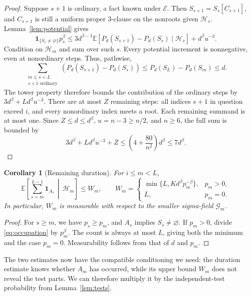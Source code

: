 \documentclass[11pt]{article}
\newtheorem{corollary}[theorem]{Corollary}
\theoremstyle{remark}
\newcommand{\E}{\mathbb E}
\newcommand{\ind}{\mathbf 1}
\newcommand{\cE}{\mathcal E}
\newcommand{\cG}{\mathcal G}
\newcommand{\cH}{\mathcal H}
\numberwithin{equation}{section}
\begin{document}
\begin{proof}
Suppose $s+1$ is ordinary, a fact known under $\cE$.
Then $S_{s+1}=S_s[C_{s+1}]$, and $C_{s+1}$ is still a uniform proper
3-clause on the nonroots given $\cH_s$. Lemma~\ref{lem:potential} gives
\[
 \ind_{\{S_s\ne\varnothing\}}p_s^\beta
 \le3d^{\beta-1}\E[P_d(S_{s+1})-P_d(S_s)\mid\cH_s]
          +d^\beta u^{-3}.
\]
Condition on $\cH_m$ and sum over such $s$. Every potential increment
is nonnegative, even at nonordinary steps. Thus, pathwise,
\[
 \sum_{\substack{m\le s<L\\s+1\text{ ordinary}}}
       (P_d(S_{s+1})-P_d(S_s))
 \le P_d(S_L)-P_d(S_m)\le d.
\]
The tower property therefore bounds the contribution of the ordinary
steps by $3d^\beta+Ld^\beta u^{-3}$.
There are at most $Z$ remaining steps: all indices $s+1$ in question
exceed $i$, and every nonordinary index meets a root.
Each remaining summand is at most one. Since $Z\le d\le d^\beta$,
$u=n-3\ge n/2$, and $n\ge6$, the full sum is bounded by
\[
 3d^\beta+Ld^\beta u^{-3}+Z
 \le \left(4+\frac{80}{n^2}\right)d^\beta\le7d^\beta.
\]
\end{proof}

\begin{corollary}[Remaining duration]
\label{cor:duration}
For $i\le m<L$,
\begin{equation}
 \E\left[\sum_{s=m}^{L-1}\ind_{A_s}\,\middle|\,\cH_m\right]\le W_m,
 \qquad
 W_m=\begin{cases}
 \min\{L,Kd^\beta p_m^{-\beta}\},&p_m>0,\\
 L,&p_m=0.
 \end{cases}
 \label{eq:duration}
\end{equation}
In particular, $W_m$ is measurable with respect to the smaller
sigma-field $\cG_m$.
\end{corollary}

\begin{proof}
For $s\ge m$, we have $p_s\ge p_m$, and $A_s$ implies
$S_s\ne\varnothing$. If $p_m>0$, divide \eqref{eq:occupation} by
$p_m^\beta$. The count is always at most $L$, giving both the minimum
and the case $p_m=0$. Measurability follows from that of $d$ and $p_m$.
\end{proof}

The two estimates now have the compatible conditioning we need:
the duration estimate knows whether $A_m$ has occurred, while its
upper bound $W_m$ does not reveal the test parts. We can therefore
multiply it by the independent-test probability from
Lemma~\ref{lem:tests}.
\end{document}
